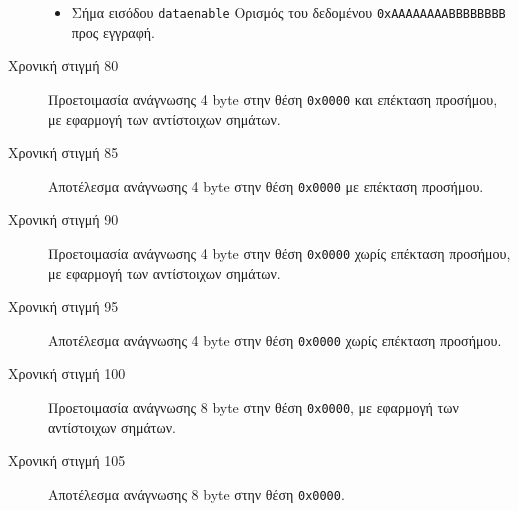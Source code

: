 \documentclass[11pt]{extarticle}
\begin{document}
\begin{description}
\begin{itemize}
    \item Σήμα εισόδου \texttt{data\textunderscore enable} \newline Ορισμός του δεδομένου \texttt{0xAAAAAAAABBBBBBBB} προς εγγραφή.
\end{itemize}
\item [Χρονική στιγμή 80] \hfill \newline
Προετοιμασία ανάγνωσης 4 byte στην θέση \texttt{0x0000} και επέκταση προσήμου, με εφαρμογή των αντίστοιχων σημάτων.
\item [Χρονική στιγμή 85] \hfill \newline
Αποτέλεσμα ανάγνωσης 4 byte στην θέση \texttt{0x0000} με επέκταση προσήμου.
\item [Χρονική στιγμή 90] \hfill \newline
Προετοιμασία ανάγνωσης 4 byte στην θέση \texttt{0x0000} χωρίς επέκταση προσήμου, με εφαρμογή των αντίστοιχων σημάτων.
\item [Χρονική στιγμή 95] \hfill \newline
Αποτέλεσμα ανάγνωσης 4 byte στην θέση \texttt{0x0000} χωρίς επέκταση προσήμου.
\item [Χρονική στιγμή 100] \hfill \newline
Προετοιμασία ανάγνωσης 8 byte στην θέση \texttt{0x0000}, με εφαρμογή των αντίστοιχων σημάτων.
\item [Χρονική στιγμή 105] \hfill \newline
Αποτέλεσμα ανάγνωσης 8 byte στην θέση \texttt{0x0000}.
\end{description}
\end{document}
